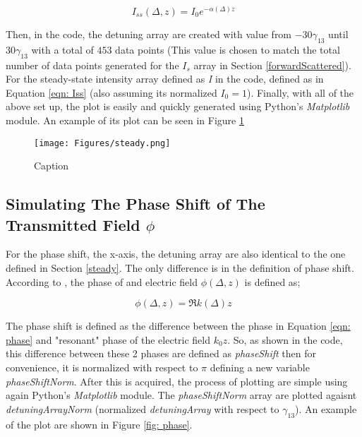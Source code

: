 \begin{equation}
    I_{ss}(\Delta, z) = I_{0} e^{-\alpha(\Delta) z}
    \label{eqn: Iss}
\end{equation}

Then, in the code, the detuning array are created with value from $-30\gamma_{13}$ until $30\gamma_{13}$ with a total of $453$ data points (This value is chosen to match the total number of data points generated for the $I_{s}$ array in Section \ref{forwardScattered}). For the steady-state intensity array defined as \textit{I} in the code, defined as in Equation \ref{eqn: Iss} (also assuming its normalized $I_{0} = 1$). Finally, with all of the above set up, the plot is easily and quickly generated using Python's \textit{Matplotlib} module. An example of its plot can be seen in Figure \ref{fig: steady}

\begin{figure}[h!]
    \centering
    \texttt{[image: Figures/steady.png]}
    \caption{Caption}
    \label{fig: steady}
\end{figure}

\subsection{Simulating The Phase Shift of The Transmitted Field $\phi$}
For the phase shift, the x-axis, the detuning array are also identical to the one defined in Section \ref{steady}. The only difference is in the definition of phase shift. According to \cite{boyd2020nonlinear}, the phase of and electric field $\phi(\Delta, z)$ is defined as;

\begin{equation}
    \phi(\Delta, z) = \Re{k(\Delta)} z
    \label{eqn: phase}
\end{equation}

The phase shift is defined as the difference between the phase in Equation \ref{eqn: phase} and "resonant" phase of the electric field $k_{0}z$. So, as shown in the code, this difference between these 2 phases are defined as \textit{phaseShift} then for convenience, it is normalized with respect to $\pi$ defining a new variable \textit{phaseShiftNorm}. After this is acquired, the process of plotting are simple using again Python's \textit{Matplotlib} module. The \textit{phaseShiftNorm} array are plotted agaisnt \textit{detuningArrayNorm} (normalized \textit{detuningArray} with respect to $\gamma_{13}$). An example of the plot are shown in Figure \ref{fig: phase}.

